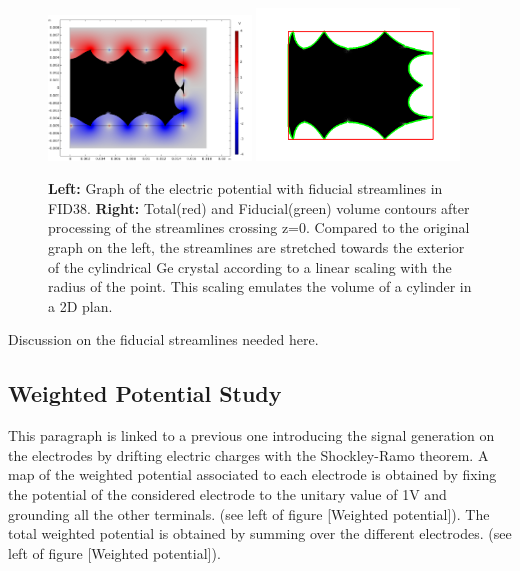 \begin{figure}
\centering
\includegraphics[width=0.48\textwidth]{Figures/Electrodes/fid38_fiducial_streamlines.png}
\includegraphics[width=0.48\textwidth]{Figures/Electrodes/fid38_fiducial_contour.png}
\caption{
\textbf{Left:} Graph of the electric potential with fiducial streamlines in FID38.
\textbf{Right:} Total(red) and Fiducial(green) volume contours after processing of the streamlines crossing z=0. Compared to the original graph on the left, the streamlines are stretched towards the exterior of the cylindrical Ge crystal according to a linear scaling with the radius of the point. This scaling emulates the volume of a cylinder in a 2D plan.
}
\label{fig:fid38-fiducial}
\end{figure}

{\color{blue} Discussion on the fiducial streamlines needed here.}

\subsection{Weighted Potential Study}

This paragraph is linked to a previous one introducing the signal generation on the electrodes by drifting electric charges with the Shockley-Ramo theorem. A map of the weighted potential associated to each electrode is obtained by fixing the potential of the considered electrode to the unitary value of 1V and grounding all the other terminals. (see left of  figure [Weighted potential]). The total weighted potential is obtained by summing over the different electrodes. (see left of  figure [Weighted potential]).

